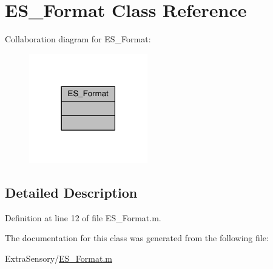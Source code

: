 \hypertarget{class_e_s___format}{\section{E\+S\+\_\+\+Format Class Reference}
\label{class_e_s___format}
}


Collaboration diagram for E\+S\+\_\+\+Format\+:\nopagebreak
\begin{figure}[H]
\begin{center}
\leavevmode
\includegraphics[width=146pt]{d9/d6d/class_e_s___format__coll__graph}
\end{center}
\end{figure}


\subsection{Detailed Description}


Definition at line 12 of file E\+S\+\_\+\+Format.\+m.



The documentation for this class was generated from the following file\+:\begin{DoxyCompactItemize}
\item 
Extra\+Sensory/\hyperlink{_e_s___format_8m}{E\+S\+\_\+\+Format.\+m}\end{DoxyCompactItemize}
